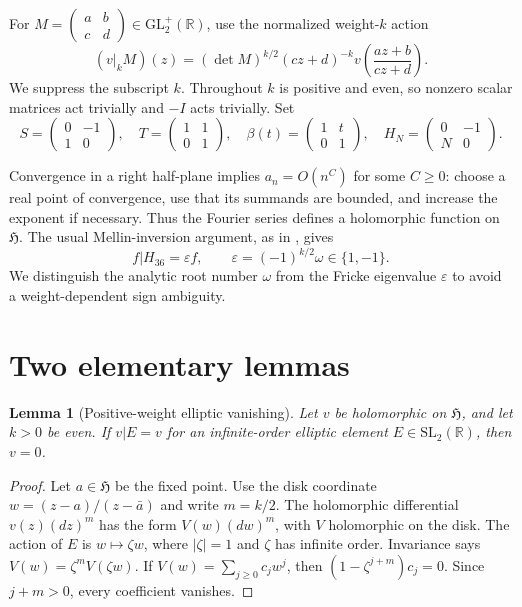 \documentclass[11pt]{article}
\newtheorem{lemma}[theorem]{Lemma}
\theoremstyle{remark}
\newcommand{\HH}{\mathfrak H}
\newcommand{\SL}{\mathrm{SL}}
\newcommand{\eps}{\varepsilon}
\newcommand{\bb}{\beta}
\begin{document}
For $M=\begin{pmatrix}a&b\\c&d\end{pmatrix}\in\mathrm{GL}_2^+(\mathbb R)$,
use the normalized weight-$k$ action
\[
 (v|_k M)(z)=(\det M)^{k/2}(cz+d)^{-k}
 v\left(\frac{az+b}{cz+d}\right).
\]
We suppress the subscript $k$.  Throughout $k$ is positive and even, so
nonzero scalar matrices act trivially and $-I$ acts trivially.  Set
\[
 S=\begin{pmatrix}0&-1\\1&0\end{pmatrix},\quad
 T=\begin{pmatrix}1&1\\0&1\end{pmatrix},\quad
 \bb(t)=\begin{pmatrix}1&t\\0&1\end{pmatrix},\quad
 H_N=\begin{pmatrix}0&-1\\N&0\end{pmatrix}.
\]

Convergence in a right half-plane implies $a_n=O(n^C)$ for some $C\ge0$:
choose a real point of convergence, use that its summands are bounded,
and increase the exponent if necessary.  Thus the Fourier series defines
a holomorphic function on $\HH$.  The usual Mellin-inversion argument,
as in \cite[Section~1]{CF}, gives
\begin{equation}\label{eq:fricke}
 f|H_{36}=\eps f,\qquad \eps=(-1)^{k/2}\omega\in\{1,-1\}.
\end{equation}
We distinguish the analytic root number $\omega$ from the Fricke
eigenvalue $\eps$ to avoid a weight-dependent sign ambiguity.

\section{Two elementary lemmas}

\begin{lemma}[Positive-weight elliptic vanishing]\label{lem:elliptic}
Let $v$ be holomorphic on $\HH$, and let $k>0$ be even.  If
$v|E=v$ for an infinite-order elliptic element $E\in\SL_2(\mathbb R)$,
then $v=0$.
\end{lemma}
\begin{proof}
Let $a\in\HH$ be the fixed point.  Use the disk coordinate
$w=(z-a)/(z-\bar a)$ and write $m=k/2$.  The holomorphic differential
$v(z)(dz)^m$ has the form $V(w)(dw)^m$, with $V$ holomorphic on the disk.
The action of $E$ is $w\mapsto\zeta w$, where $|\zeta|=1$ and $\zeta$
has infinite order.  Invariance says
$V(w)=\zeta^m V(\zeta w)$.  If $V(w)=\sum_{j\ge0}c_jw^j$, then
$(1-\zeta^{j+m})c_j=0$.  Since $j+m>0$, every coefficient vanishes.
\end{proof}
\end{document}
